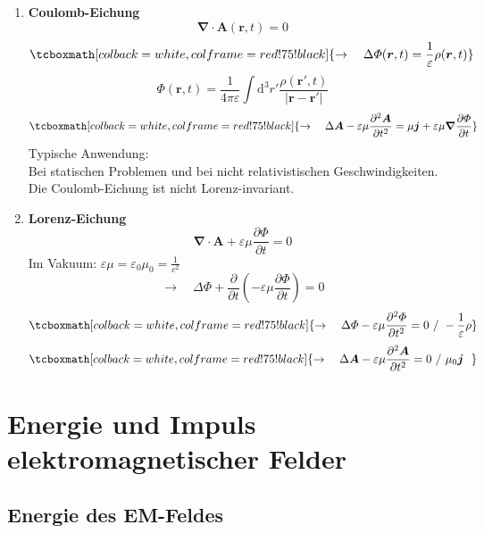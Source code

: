 \documentclass[titlepage,11pt,a4paper,ngerman]{report}
\newcommand{\tx}[1]{\textrm{#1}}
\newcommand{\dd}{\tx{d}}
\newcommand{\prt}[2]{\frac{\partial #1}{\partial #2}}
\renewcommand{\Phi}{\varPhi}
\renewcommand{\vec}[1]{\boldsymbol{#1}}
\renewcommand{\epsilon}{\varepsilon}
\newcommand{\vabla}{\boldsymbol{\nabla}}
\newcommand{\rmbox}[1]{\tcboxmath[colback=white,colframe=red!75!black]{#1}}
\begin{document}
\begin{enumerate}[1)]
	\item \textbf{Coulomb-Eichung}
	\begin{equation*}
	\vabla \cdot \vec{A}(\vec{r},t) = 0
	\end{equation*}
	\begin{equation*}
	\rmbox{\rightarrow \quad \Delta \Phi(\vec{r},t) = \frac{1}{\epsilon} \rho(\vec{r},t)}
	\end{equation*}
	\begin{equation*}
	\Phi(\vec{r},t) = \frac{1}{4 \pi \epsilon} \int \dd ^3 r' \frac{\rho(\vec{r}',t)}{|\vec{r} - \vec{r}'|}
	\end{equation*}
	\begin{equation*}
	\rmbox{ \rightarrow \quad \Delta \vec{A} - \epsilon \mu \prt{^2 \vec{A}}{t^2} = \mu \vec{j} + \epsilon \mu \vabla \prt{\Phi}{t}}
	\end{equation*}
	Typische Anwendung:\\
	Bei statischen Problemen und bei nicht relativistischen Geschwindigkeiten.\\
	Die Coulomb-Eichung ist nicht Lorenz-invariant.
	\item \textbf{Lorenz-Eichung}
	\begin{equation*}
	\vabla \cdot \vec{A} + \epsilon \mu \prt{\Phi}{t} = 0
	\end{equation*}
	Im Vakuum: $ \epsilon \mu = \epsilon_0 \mu_0 = \frac{1}{c^2} $
	\begin{equation*}
	\rightarrow \quad \Delta \Phi + \prt{}{t} \left(- \epsilon \mu \prt{\Phi}{t}\right) = 0
	\end{equation*}
	\begin{equation*}
	\rmbox{\rightarrow \quad \Delta \Phi - \epsilon \mu \prt{^2 \Phi}{t^2} = 0 \ / \ - \frac{1}{\epsilon} \rho}
	\end{equation*}
	\begin{equation*}
	\rmbox{\rightarrow \quad \Delta \vec{A} - \epsilon \mu \prt{^2 \vec{A}}{t^2} = 0 \ / \ \mu_0 \vec{j} \ \ }
	\end{equation*}
\end{enumerate}


\section{Energie und Impuls elektromagnetischer Felder}

\subsection{Energie des EM-Feldes}
\end{document}
